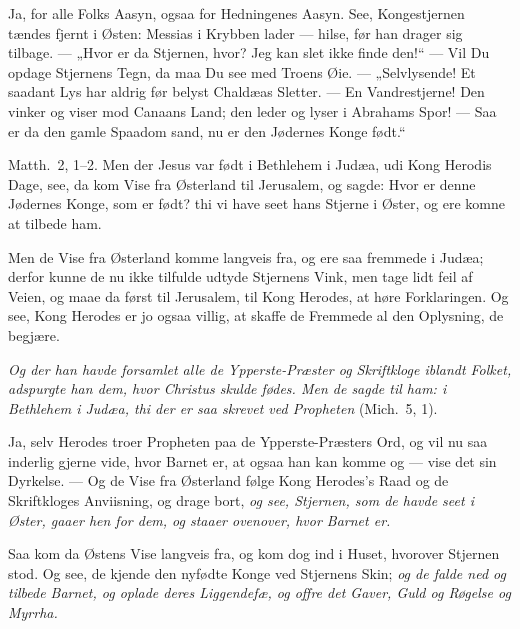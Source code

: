 \documentclass[12pt,a4paper]{book}
\begin{document}
Ja, for alle Folks Aasyn, ogsaa for Hedningenes Aasyn. See, Kongestjernen tændes
fjernt i Østen: Messias i Krybben lader --- hilse, før han drager sig tilbage.
--- „Hvor er da Stjernen, hvor? Jeg kan slet ikke finde den!“ --- Vil Du opdage
Stjernens Tegn, da maa Du see med Troens Øie. --- „Selvlysende! Et saadant Lys
har aldrig før belyst Chaldæas Sletter. --- En Vandrestjerne! Den vinker og viser
mod Canaans Land; den leder og lyser i Abrahams Spor! --- Saa er da den gamle
Spaadom sand, nu er den Jødernes Konge født.“

\begingroup\large
Matth.\ 2, 1--2. Men der Jesus var født i Bethlehem i Judæa, udi Kong Herodis
Dage, see, da kom Vise fra Østerland til Jerusalem, og sagde: Hvor er denne
Jødernes Konge, som er født? thi vi have seet hans Stjerne i Øster, og ere komne
at tilbede ham.
\par\endgroup

Men de Vise fra Østerland komme langveis fra, og ere saa
fremmede i Judæa; derfor kunne de nu ikke tilfulde udtyde Stjernens Vink, men
tage lidt feil af Veien, og maae da først til Jerusalem, til Kong Herodes, at
høre Forklaringen. Og see, Kong Herodes er jo ogsaa villig, at skaffe de
Fremmede al den Oplysning, de begjære.

\emph{Og der han havde forsamlet alle de Ypperste-Præster og Skriftkloge iblandt
Folket, adspurgte han dem, hvor Christus skulde fødes. Men de sagde til ham: i
Bethlehem i Judæa, thi der er saa skrevet ved Propheten} (Mich.\ 5, 1).

Ja, selv Herodes troer Propheten paa de Ypperste-Præsters Ord, og vil nu saa
inderlig gjerne vide, hvor Barnet er, at ogsaa han kan komme og --- vise det sin
Dyrkelse. --- Og de Vise fra Østerland følge Kong Herodes's Raad og de
Skriftkloges Anviisning, og drage bort, \emph{og see, Stjernen, som de havde seet
i Øster, gaaer hen for dem, og staaer ovenover, hvor Barnet er.}

Saa kom da Østens Vise langveis fra, og kom dog ind i Huset, hvorover Stjernen
stod. Og see, de kjende den nyfødte Konge ved Stjernens Skin; \emph{og de falde
ned og tilbede Barnet, og oplade deres Liggendefæ, og offre det Gaver, Guld og
Røgelse og Myrrha.}
\end{document}
